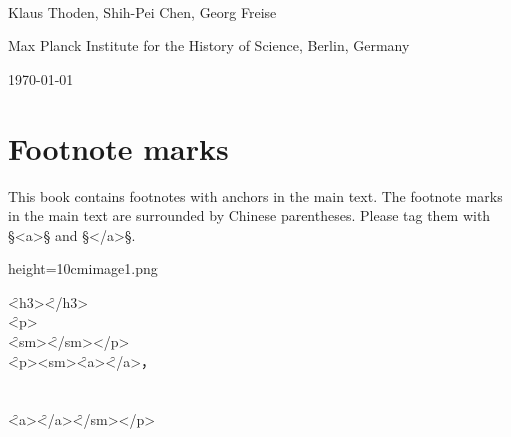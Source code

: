 \documentclass[fontsize=11pt, paper=a4, 
  DIV15,
  normalheadings,
  parskip=half-, 
  pointlessnumbers]{scrartcl}
\begin{document}
\begin{center}
  {} \\[5mm]
  \large Klaus Thoden, Shih-Pei Chen, Georg Freise

  \normalsize Max Planck Institute for the History of Science, Berlin, Germany

  \today
\end{center}

\section{Footnote marks}
\begin{mainrule}
  This book contains footnotes with anchors in the main text. The
  footnote marks in the main text are surrounded by Chinese
  parentheses. Please tag them with §<a>§ and §</a>§.
\end{mainrule}

\vspace{3mm}
\begin{sampleImageSmall}{height=10cm}{image1.png}
\end{sampleImageSmall}
\begin{typeChinese}
  \f{<h3>}\f{</h3>}\\
  \f{<p>}\\
  \f{<sm>}\f{</sm></p>}\\
  \f{<p><sm>}\f{<a>}\f{</a>，}\\
  \\
  \\
  \f{<a>}\f{</a>}\f{</sm></p>}
\end{typeChinese}
\end{document}
